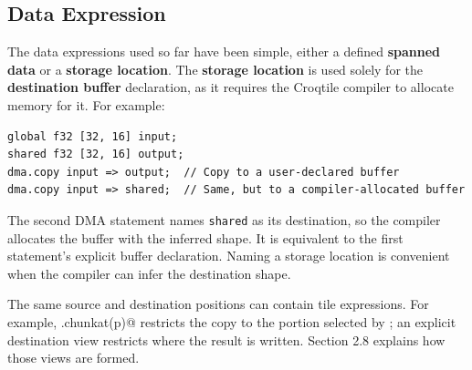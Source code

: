 \subsection*{Data Expression}

The data expressions used so far have been simple, either a defined \textbf{spanned data} or a \textbf{storage location}. The \textbf{storage location} is used solely for the \textbf{destination buffer} declaration, as it requires the Croqtile compiler to allocate memory for it. For example:

\begin{lstlisting}[language=croqtile,caption={Data Expression}]
global f32 [32, 16] input;
shared f32 [32, 16] output;
dma.copy input => output;  // Copy to a user-declared buffer
dma.copy input => shared;  // Same, but to a compiler-allocated buffer
\end{lstlisting}

The second DMA statement names \texttt{shared} as its destination, so the compiler allocates the buffer with the inferred shape. It is equivalent to the first statement's explicit buffer declaration. Naming a storage location is convenient when the compiler can infer the destination shape.

The same source and destination positions can contain tile expressions. For example, \co@input.chunkat(p)@ restricts the copy to the portion selected by \co@p@; an explicit destination view restricts where the result is written. Section 2.8 explains how those views are formed.
